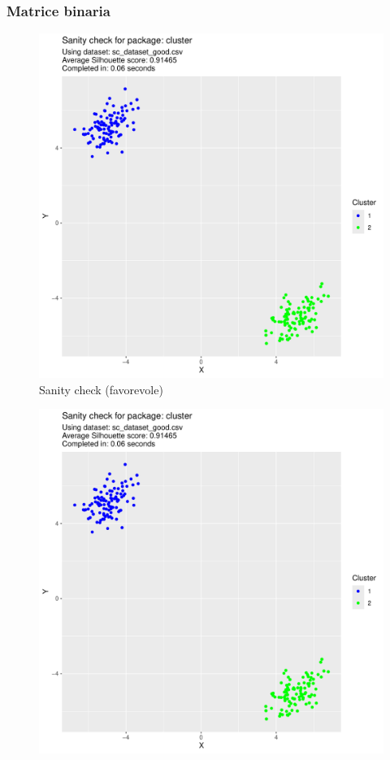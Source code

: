 \documentclass{beamer}
\begin{document}
        \begin{frame}
            \frametitle{Matrice binaria}

            \centering
            \begin{boxedminipage}{0.49\textwidth}
                \begin{figure}
                    \includegraphics[width = \textwidth, page = 1]{results/results_CLUSTER.pdf}
                    \caption{Sanity check (favorevole)}
                \end{figure}
            \end{boxedminipage}
            \begin{boxedminipage}{0.49\textwidth}
                \begin{figure}
                    \includegraphics[width = \textwidth, page = 2]{results/results_CLUSTER.pdf}

\end{figure}
\end{boxedminipage}
\end{frame}
\end{document}
